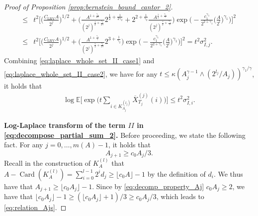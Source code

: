 \documentclass[11pt]{article}
\DeclareMathOperator*{\card}{Card}
\theoremstyle{plain}
\theoremstyle{definition}
\begin{document}
\begin{proof}[Proof of Proposition \ref{prop:bernstein_bound_cantor_2}]
\begin{equation*}
\begin{aligned}
    \leq& t^2\bigg[\bigg(\frac{C_{\mathrm{LRV}}A}{2^{j}}\bigg)^{1/2} +  \bigg(\frac{A^{1+\frac{\gamma_1}{2\gamma}}}{(2^j)^{\frac{1}{2}+\frac{\gamma_1}{2\gamma}}}2^{\frac{1}{2}+\frac{1}{2\gamma_2}} + 2^{2+\frac{1}{\gamma_2}}\frac{A^{\frac{\gamma}{2}+\frac{\gamma_1}{\gamma}}}{(2^j)^{\frac{\gamma}{2}+\frac{\gamma_1}{\gamma}}}\bigg) \exp\bigg(-\frac{c_1^{\gamma_1}}{2^{2+\gamma_1}}\bigg(\frac{A}{2^l}\bigg)^{\gamma_1}\bigg)\bigg]^2\\
    \leq& t^2\bigg[\bigg(\frac{C_{\mathrm{LRV}}A}{2^{j}}\bigg)^{1/2} +  \bigg(\frac{A^{1+\frac{\gamma_1}{\gamma}}}{(2^j)^{\frac{\gamma}{2}+\frac{\gamma_1}{2\gamma}}}2^{3+\frac{1}{\gamma_2}}\bigg) \exp\bigg(-\frac{c_1^{\gamma_1}}{2^{2+\gamma_1}}\bigg(\frac{A}{2^l}\bigg)^{\gamma_1}\bigg)\bigg]^2
    = t^2\sigma_{I,j}^2.
\end{aligned}
\end{equation*}
Combining \eqref{eq:laplace_whole_set_II_case1} and \eqref{eq:laplace_whole_set_II_case2}, we have for any $t \leq \kappa(A_j^{\gamma-1} \wedge (2^{l_j}/A_j))^{\gamma_1/\gamma}$, it holds that
\begin{equation}\label{eq:log-laplace_termI}
\begin{aligned}
    \log\mathbb{E}\Big[\exp\Big(t\sum_{i \in K_{A_j}^{(l_j)}}\overline{X}_{T_j}^{(j)}(i)\Big)\Big] \leq t^2\sigma_{I,i}^2.
\end{aligned}
\end{equation}

\textbf{Log-Laplace transform of the term $II$ in \eqref{eq:decompose_partial_sum_2}.} Before proceeding, we state the following fact. For any $j = 0, \dots, m(A)-1$, it holds that
\begin{equation}\label{eq:relation_Ajs}
    A_{j+1} \geq c_0A_j/3.
\end{equation}
Recall in the construction of $K_A^{(l)}$ that $A - \card(K_A^{(l)}) = \sum_{i = 0}^{l-1}2^id_j \geq \lfloor c_0A \rfloor - 1$ by the definition of $d_i$. We thus have that $A_{j+1} \geq \lfloor c_0A_j \rfloor - 1$. Since by \eqref{eq:decomp_property_Aj} $c_0A_j \geq 2$, we have that $\lfloor c_0A_j \rfloor - 1 \geq (\lfloor c_0A_j \rfloor + 1)/3 \geq c_0A_j/3$, which leads to \eqref{eq:relation_Ajs}.



\end{proof}
\end{document}
